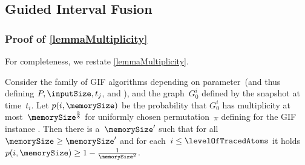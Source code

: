\documentclass[envcountsame]{llncs}
\begin{document}
\subsection{Guided Interval Fusion}
\label{appendixGIF}

\subsubsection{Proof of \autoref{lemmaMultiplicity}}
For completeness, we restate \autoref{lemmaMultiplicity}.
\begin{lemma}\label{lemmaMultiplicityRestate}
	Consider the family of GIF algorithms depending on parameter~\memorySize (and thus defining $P,\inputSize,t_j$, and \levelOfTracedAtoms), and the graph~$G^i_0$ defined by the snapshot at time~$t_i$.
	Let $p(i,\memorySize)$ be the probability that $G^i_0$ has multiplicity at most~$\memorySize^{\frac{5}{8}}$ for uniformly chosen permutation~$\pi$ defining \binaryTreeOf{\gifInstance} for the GIF instance \gifInstance. 
	Then there is a~$\memorySize^\prime$ such that for all $\memorySize\geq \memorySize^\prime$ and for each~$i \leq \levelOfTracedAtoms$ it holds $p(i,\memorySize) \geq  1-\frac{1}{\memorySize^2}$.
\end{lemma}
\end{document}
